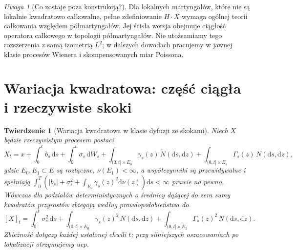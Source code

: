 \documentclass[11pt,a4paper,oneside]{report}
\numberwithin{equation}{chapter}
\theoremstyle{plain}
\newtheorem{twierdzenie}{Twierdzenie}[chapter]
\theoremstyle{definition}
\theoremstyle{remark}
\newtheorem{uwaga}{Uwaga}[chapter]
\newcommand{\dd}{\mathrm{d}}
\begin{document}
\begin{uwaga}[Co zostaje poza konstrukcją?]
Dla lokalnych martyngałów, które nie są lokalnie
kwadratowo całkowalne, pełne zdefiniowanie
$H\cdot X$ wymaga ogólnej teorii całkowania względem
półmartyngałów. Jej ścisła wersja obejmuje ciągłość
operatora całkowego w topologii półmartyngałów.
Nie utożsamiamy tego rozszerzenia z samą izometrią $L^2$;
w dalszych dowodach pracujemy w jawnej klasie
procesów Wienera i skompensowanych miar Poissona.
\end{uwaga}

\section{Wariacja kwadratowa: część ciągła i rzeczywiste skoki}

\begin{twierdzenie}[Wariacja kwadratowa w klasie dyfuzji ze skokami]
\label{th:jump-qv}
Niech $X$ będzie rzeczywistym procesem postaci
\[
X_t=x+\int_0^t b_s\,\dd s+\int_0^t\sigma_s\,\dd W_s
+\int_{(0,t]\times E_0}\gamma_s(z)\,\widetilde N(\dd s,\dd z)
+\int_{(0,t]\times E_1}\Gamma_s(z)\,N(\dd s,\dd z),
\]
gdzie $E_0,E_1\subset E$ są rozłączne,
$\nu(E_1)<\infty$, a współczynniki są przewidywalne i spełniają
$\int_0^T(|b_s|+\sigma_s^2+\int_{E_0}\gamma_s(z)^2\dd\nu(z))\dd s
<\infty$ prawie na pewno.
Wówczas dla podziałów deterministycznych o średnicy dążącej
do zera sumy kwadratów przyrostów zbiegają według
prawdopodobieństwa do
\[
[X]_t=\int_0^t\sigma_s^2\,\dd s
+\int_{(0,t]\times E_0}\gamma_s(z)^2\,N(\dd s,\dd z)
+\int_{(0,t]\times E_1}\Gamma_s(z)^2\,N(\dd s,\dd z).
\tag{12.2}\label{eq:jump-qv}
\]
Zbieżność dotyczy każdej ustalonej chwili $t$; przy
silniejszych oszacowaniach po lokalizacji otrzymujemy ucp.
\end{twierdzenie}
\end{document}
